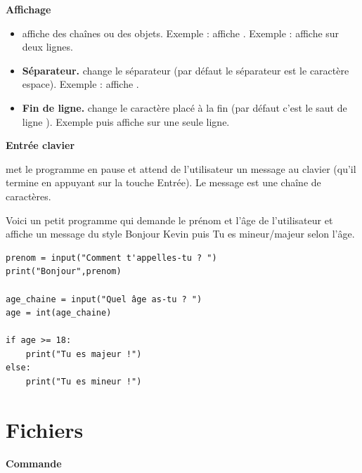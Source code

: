 \documentclass[11pt,class=report,crop=false]{standalone}
\begin{document}
\textbf{Affichage}

\begin{itemize}
  \item {} \quad affiche des chaînes ou des objets.
 Exemple :  affiche .
 Exemple :  affiche sur deux lignes.
 
  \item \textbf{Séparateur.}  \quad change le séparateur (par défaut le séparateur est le caractère espace). Exemple :  affiche
  .
  
   \item \textbf{Fin de ligne.}  \quad change le caractère placé à la fin (par défaut c'est le saut de ligne \ci{\\n}).
   Exemple  puis  affiche  sur une seule ligne.
   
\end{itemize}

\bigskip

\textbf{Entrée clavier}

 \quad  met le programme en pause et attend de l'utilisateur un message au clavier (qu'il termine en appuyant sur la touche \og{}Entrée\fg{}). Le message est une chaîne de caractères.

Voici un petit programme qui demande le prénom et l'âge de l'utilisateur et affiche un message du style 
\og{}Bonjour Kevin\fg{} puis \og{}Tu es mineur/majeur\fg{} selon l'âge. 
\begin{lstlisting}
prenom = input("Comment t'appelles-tu ? ")
print("Bonjour",prenom)

age_chaine = input("Quel âge as-tu ? ")
age = int(age_chaine)

if age >= 18:
    print("Tu es majeur !")
else:
    print("Tu es mineur !")
\end{lstlisting}  




\section{Fichiers}

\textbf{Commande} 
\end{document}

